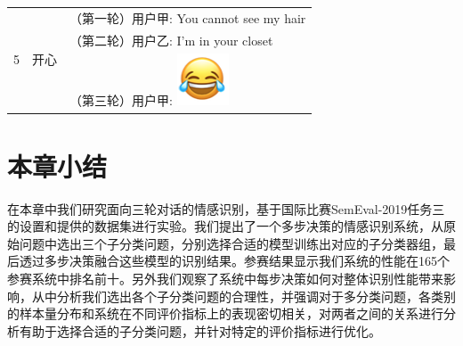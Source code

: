 \begin{table}[]
\begin{minipage}[t]{0.7\linewidth}
\begin{tabularx}{\linewidth}{c|c|l}
  \hline
  \multirow{3}{*}{5} & \multirow{3}{*}{开心} 
    &   （第一轮）用户甲: You cannot see my hair \\
    & & （第二轮）用户乙: I'm in your closet \\
    & & （第三轮）用户甲: \includegraphics[height=1.5\fontcharht\font`\B]{img/emoji/lol.png} \\
  \bottomrule[1.5pt]
  \end{tabularx}
  \end{minipage}
\end{table}

\section{本章小结}

在本章中我们研究面向三轮对话的情感识别，基于国际比赛SemEval-2019任务三的设置和提供的数据集进行实验。我们提出了一个多步决策的情感识别系统，从原始问题中选出三个子分类问题，分别选择合适的模型训练出对应的子分类器组，最后透过多步决策融合这些模型的识别结果。参赛结果显示我们系统的性能在165个参赛系统中排名前十。另外我们观察了系统中每步决策如何对整体识别性能带来影响，从中分析我们选出各个子分类问题的合理性，并强调对于多分类问题，各类别的样本量分布和系统在不同评价指标上的表现密切相关，对两者之间的关系进行分析有助于选择合适的子分类问题，并针对特定的评价指标进行优化。

